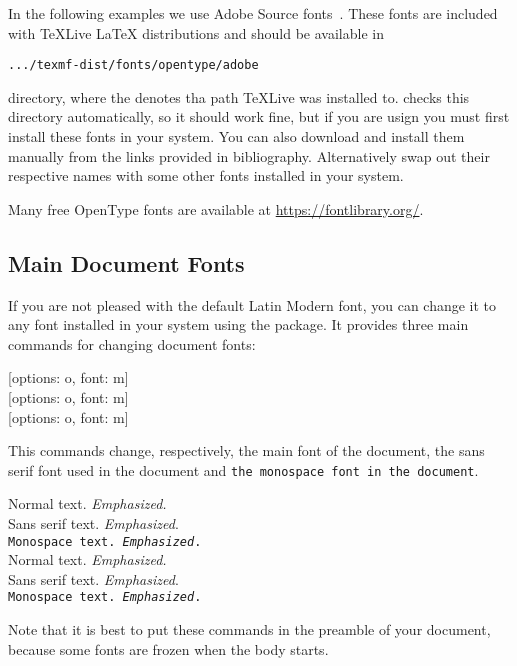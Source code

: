 In the following examples we use Adobe Source fonts~\cites{sourceserif,
  sourcesans, sourcecodepro}. These fonts are included with \TeX{}Live \LaTeX{}
distributions and should be available in
\begin{code}
  \nolinkurl{.../texmf-dist/fonts/opentype/adobe}
\end{code}
directory, where the  denotes tha path \TeX{}Live was installed to.
 checks this directory automatically, so it should work fine,
but if you are usign  you must first install these fonts in your
system. You can also download and install them manually from the links provided
in bibliography. Alternatively swap out their respective names with some other
fonts installed in your system.

Many free OpenType fonts are available at \url{https://fontlibrary.org/}.

\subsection{Main Document Fonts}

If you are not pleased with the default Latin Modern font, you can change it to
any font installed in your system using the  package. It provides
three main commands for changing document fonts:
\begin{lscommand}
  [options: o, font: m] \\
  [options: o, font: m] \\
  [options: o, font: m]
\end{lscommand}
This commands change, respectively, the main font of the document, \textsf{the
  sans serif font used in the document} and \texttt{the monospace font in the
  document}.
\begin{example}
Normal text.
  \emph{Emphasized.} \\
\textsf{Sans serif text.
  \emph{Emphasized}.} \\
\texttt{Monospace text.
  \emph{Emphasized}.} \\

\setmainfont{Source Serif Pro}
\setsansfont{Source Sans Pro}
\setmonofont{Source Code Pro}
Normal text.
  \emph{Emphasized.} \\
\textsf{Sans serif text.
  \emph{Emphasized}.} \\
\texttt{Monospace text.
  \emph{Emphasized}.}
\end{example}
Note that it is best to put these commands in the preamble of your document,
because some fonts are frozen when the body starts.

